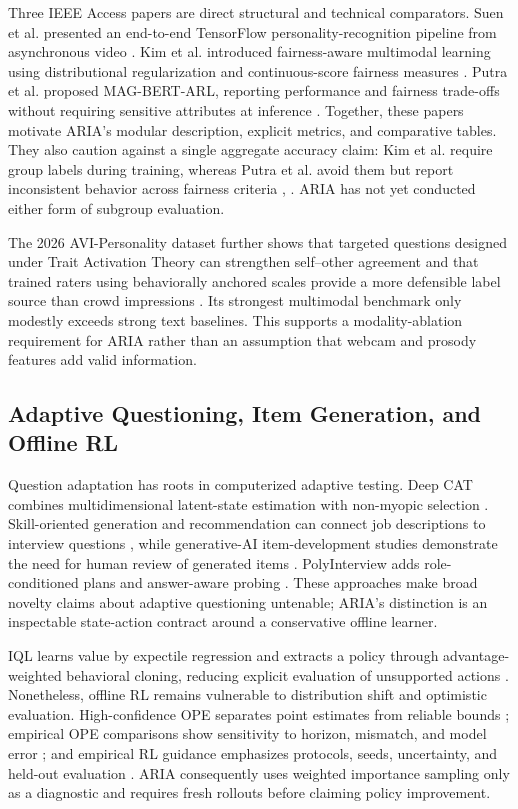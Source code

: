\documentclass[journal]{IEEEtran}
\begin{document}
Three IEEE Access papers are direct structural and technical comparators. Suen et al. presented an end-to-end TensorFlow personality-recognition pipeline from asynchronous video \cite{suen2019personality}. Kim et al. introduced fairness-aware multimodal learning using distributional regularization and continuous-score fairness measures \cite{kim2023fairness}. Putra et al. proposed MAG-BERT-ARL, reporting performance and fairness trade-offs without requiring sensitive attributes at inference \cite{putra2024magbert}. Together, these papers motivate ARIA's modular description, explicit metrics, and comparative tables. They also caution against a single aggregate accuracy claim: Kim et al. require group labels during training, whereas Putra et al. avoid them but report inconsistent behavior across fairness criteria \cite{kim2023fairness}, \cite{putra2024magbert}. ARIA has not yet conducted either form of subgroup evaluation.


The 2026 AVI-Personality dataset further shows that targeted questions designed under Trait Activation Theory can strengthen self--other agreement and that trained raters using behaviorally anchored scales provide a more defensible label source than crowd impressions \cite{zhang2026avipersonality}. Its strongest multimodal benchmark only modestly exceeds strong text baselines. This supports a modality-ablation requirement for ARIA rather than an assumption that webcam and prosody features add valid information.


\subsection{Adaptive Questioning, Item Generation, and Offline RL}

Question adaptation has roots in computerized adaptive testing. Deep CAT combines multidimensional latent-state estimation with non-myopic selection \cite{li2026deepcat}. Skill-oriented generation and recommendation can connect job descriptions to interview questions \cite{qin2023question}, while generative-AI item-development studies demonstrate the need for human review of generated items \cite{segall2025items}. PolyInterview adds role-conditioned plans and answer-aware probing \cite{wen2026polyinterview}. These approaches make broad novelty claims about adaptive questioning untenable; ARIA's distinction is an inspectable state-action contract around a conservative offline learner.


IQL learns value by expectile regression and extracts a policy through advantage-weighted behavioral cloning, reducing explicit evaluation of unsupported actions \cite{kostrikov2021iql}. Nonetheless, offline RL remains vulnerable to distribution shift and optimistic evaluation. High-confidence OPE separates point estimates from reliable bounds \cite{thomas2015hcope}; empirical OPE comparisons show sensitivity to horizon, mismatch, and model error \cite{voloshin2019ope}; and empirical RL guidance emphasizes protocols, seeds, uncertainty, and held-out evaluation \cite{patterson2023empirical}. ARIA consequently uses weighted importance sampling only as a diagnostic and requires fresh rollouts before claiming policy improvement.
\end{document}
